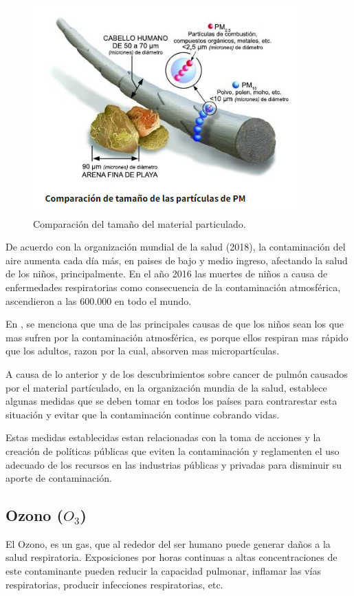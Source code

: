 \begin{figure}[!h]
\begin{center}
\includegraphics[scale=0.8]{cabello}
\end{center}
\centering
\caption{Comparación del tamaño del material particulado. \cite{EPA}}
\label{cabello}
\end{figure}


De acuerdo con la organización mundial de la salud (2018), la contaminación del aire aumenta cada día más, en paises de bajo y medio ingreso, afectando la salud de los niños, principalmente. En el año 2016 las muertes de niños a causa de enfermedades respiratorias como consecuencia de la contaminación atmosférica, ascendieron a las $600.000$ en todo el mundo. 

En \cite{OMS}, se menciona que una de las principales causas de que los niños sean los que mas sufren por la contaminación atmosférica, es porque ellos respiran mas rápido que los adultos, razon por la cual, absorven mas micropartículas. 

A causa de lo anterior y de los descubrimientos sobre cancer de pulmón causados por el material partículado, en \cite{IARC} la organización mundia de la salud, establece algunas medidas que se deben tomar en todos los países para contrarestar esta situación y evitar que la contaminación continue cobrando vidas. 

Estas medidas establecidas estan relacionadas con la toma de acciones y la creación de políticas públicas que eviten la contaminación y reglamenten el uso adecuado de los recursos en las industrias públicas y privadas para disminuir su aporte de contaminación. 

\subsection{Ozono ($O_3$)} El Ozono, es un gas, que al rededor del ser humano puede generar daños a la salud respiratoria. Exposiciones por horas continuas a altas concentraciones de este contaminante pueden reducir la capacidad pulmonar, inflamar las vías respiratorias, producir infecciones respiratorias, etc. 

